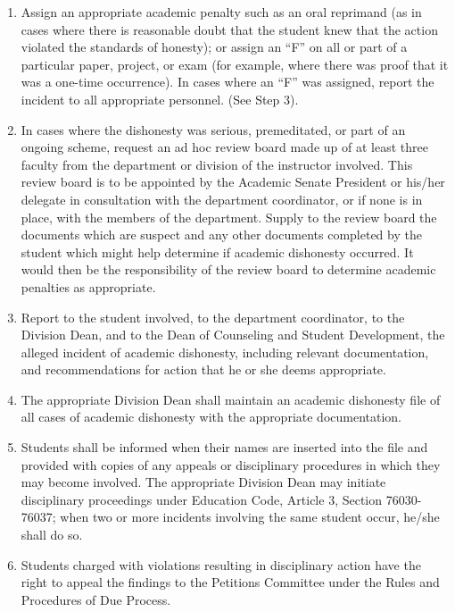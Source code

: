 \documentclass[11pt]{article}
\begin{document}
\begin{enumerate}
\item Assign an appropriate academic penalty such as an oral reprimand (as in
  cases where there is reasonable doubt that the student knew that the action
  violated the standards of honesty); or assign an “F” on all or part of a particular
  paper, project, or exam (for example, where there was proof that it was a one-time
  occurrence). In cases where an “F” was assigned, report the incident to all
  appropriate personnel. (See Step 3).
\item In cases where the dishonesty was serious, premeditated, or part of an ongoing
  scheme, request an ad hoc review board made up of at least three faculty from the
  department or division of the instructor involved. This review board is to be
  appointed by the Academic Senate President or his/her delegate in consultation with
  the department coordinator, or if none is in place, with the members of the department.
  Supply to the review board the documents which are suspect and any other documents
  completed by the student which might help determine if academic dishonesty occurred.
  It would then be the responsibility of the review board to determine academic penalties
  as appropriate.
\item Report to the student involved, to the department coordinator, to the Division Dean,
  and to the Dean of Counseling and Student Development, the alleged incident of academic
  dishonesty, including relevant documentation, and recommendations for action that he
  or she deems appropriate.
\item The appropriate Division Dean shall maintain an academic dishonesty file of all cases
  of academic dishonesty with the appropriate documentation.
\item Students shall be informed when their names are inserted into the file and provided
  with copies of any appeals or disciplinary procedures in which they may become involved.
  The appropriate Division Dean may initiate disciplinary proceedings under Education Code,
  Article 3, Section 76030-76037; when two or more incidents involving the same student occur,
  he/she shall do so.
\item  Students charged with violations resulting in disciplinary action have the right
  to appeal the findings to the Petitions Committee under the Rules and Procedures of Due
  Process.
\end{enumerate}
\end{document}
